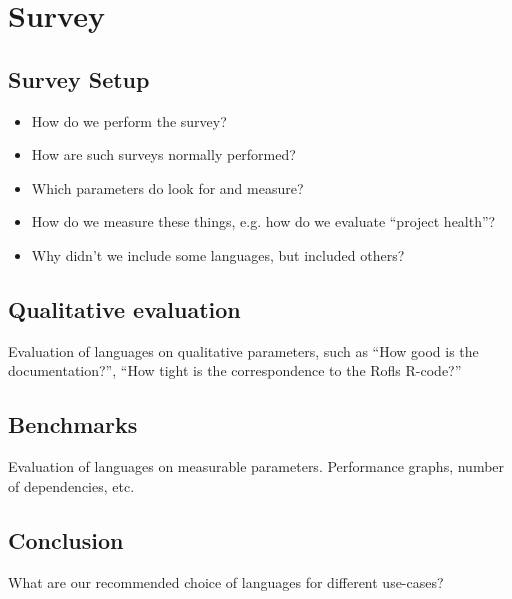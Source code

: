 \part{Survey}
\chapter{Survey Setup}
\begin{itemize}
\item How do we perform the survey?
\item How are such surveys normally performed?
\item Which parameters do look for and measure?
\item How do we measure these things, e.g. how do we evaluate ``project health''?
\item Why didn't we include some languages, but included others?
\end{itemize}

\chapter{Qualitative evaluation}
Evaluation of languages on qualitative parameters, such as ``How good
is the documentation?'', ``How tight is the correspondence to the
Rofls R-code?''

\chapter{Benchmarks}
Evaluation of languages on measurable parameters. Performance graphs,
number of dependencies, etc.

\chapter{Conclusion}
What are our recommended choice of languages for different use-cases?

